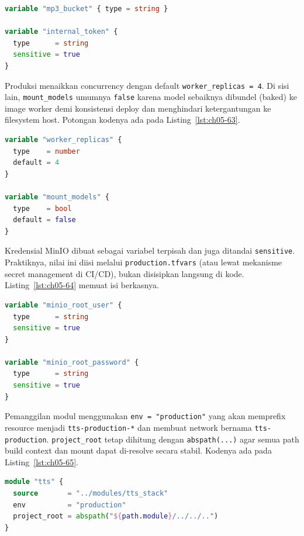 \begin{lstlisting}[language=terraform, caption={Potongan kode Terraform pada main.tf (16)}, label={lst:ch05-62}]
variable "mp3_bucket" { type = string }

variable "internal_token" {
  type      = string
  sensitive = true
}
\end{lstlisting}

Produksi menaikkan concurrency dengan default \texttt{worker\_replicas = 4}. Di sisi lain, \texttt{mount\_models} umumnya \texttt{false} karena model sebaiknya dibundel (baked) ke image worker demi konsistensi deploy dan menghindari ketergantungan ke filesystem host. Potongan kodenya ada pada Listing~\ref{lst:ch05-63}.

\begin{lstlisting}[language=terraform, caption={Potongan kode Terraform pada main.tf (17)}, label={lst:ch05-63}]
variable "worker_replicas" {
  type    = number
  default = 4
}

variable "mount_models" {
  type    = bool
  default = false
}
\end{lstlisting}

Kredensial MinIO dibuat sebagai variabel terpisah dan juga ditandai \texttt{sensitive}. Praktiknya, nilai ini diisi melalui \texttt{production.tfvars} (atau lewat mekanisme secret management di CI/CD), bukan disisipkan langsung di kode. Listing~\ref{lst:ch05-64} memuat isi berkasnya.

\begin{lstlisting}[language=terraform, caption={Potongan prod/main.tf: variabel login MinIO yang sensitif}, label={lst:ch05-64}]
variable "minio_root_user" {
  type      = string
  sensitive = true
}

variable "minio_root_password" {
  type      = string
  sensitive = true
}
\end{lstlisting}

Pemanggilan modul menggunakan \texttt{env = "production"} yang akan memprefix resource menjadi \texttt{tts-production-*} dan membuat network bernama \texttt{tts-production}. \texttt{project\_root} tetap dihitung dengan \texttt{abspath(...)} agar semua path build context dan mount dapat di-resolve secara stabil. Kodenya ada pada Listing~\ref{lst:ch05-65}.

\begin{lstlisting}[language=terraform, caption={Potongan kode Terraform pada main.tf (18)}, label={lst:ch05-65}]
module "tts" {
  source       = "../modules/tts_stack"
  env          = "production"
  project_root = abspath("${path.module}/../../..")
}
\end{lstlisting}

